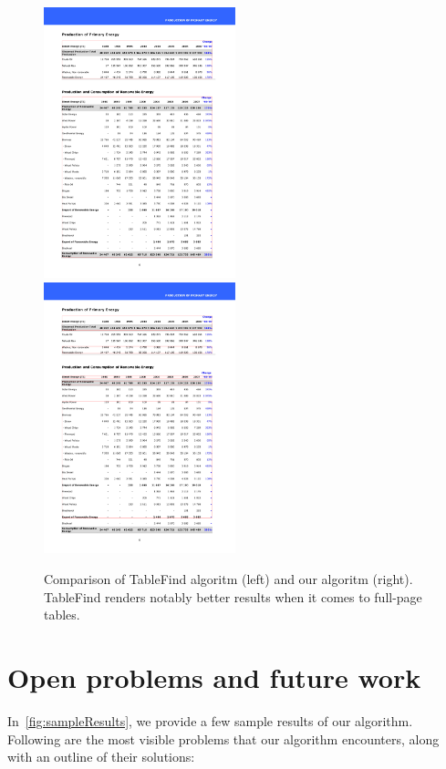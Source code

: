 \begin{figure}[t]
\centering
\includegraphics[width=15em]{img/results/tableFind1Tess.jpg}
\includegraphics[width=15em]{img/results/tableFind1Us.png}
\caption{Comparison of TableFind algoritm (left) and our algoritm (right). TableFind renders notably better results when it comes to full-page tables.}
\label{fig:tableFindComparison_Tess}
\end{figure}

\section{Open problems and future work} \label{sec:future}

In~\cref{fig:sampleResults}, we provide a few sample results of our algorithm. Following are the most visible problems that our algorithm encounters, along with an outline of their solutions:

